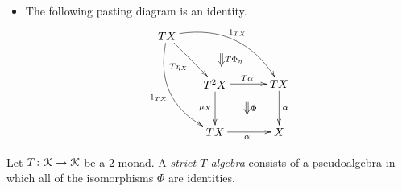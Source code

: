 \begin{Defi}
\begin{itemize}
    \item The following pasting diagram is an identity.
    \[
        \xy
            (0,0)*+{TX}="txl1";
            (15,-15)*+{T^2X}="t2x";
            (15,-30)*+{TX}="txl2";
            (35,-15)*+{TX}="txl3";
            (35,-30)*+{X}="xl";
            {\ar@/^1.7pc/^{1_{TX}} "txl1" ; "txl3"};
            {\ar@/_1.7pc/_{1_{TX}} "txl1" ; "txl2"};
            {\ar_{T\eta_X} "txl1" ; "t2x"};
            {\ar^{T\alpha} "t2x" ; "txl3"};
            {\ar_{\mu_X} "t2x" ; "txl2"};
            {\ar_{\alpha} "txl2" ; "xl"};
            {\ar^{\alpha} "txl3" ; "xl"};
            {\ar@{=>}^{T\Phi_\eta} (17,-5.5) ; (17,-9.5)};
            {\ar@{=>}^{\Phi} (25,-20.5) ; (25,-24.5)};
        \endxy
    \]

    \end{itemize}
\end{Defi}

\begin{Defi}
Let $T \colon \mathcal{K} \rightarrow \mathcal{K}$ be a $2$-monad. A \textit{strict $T$-algebra} consists of a pseudoalgebra in which all of the isomorphisms $\Phi$ are identities.
\end{Defi}

